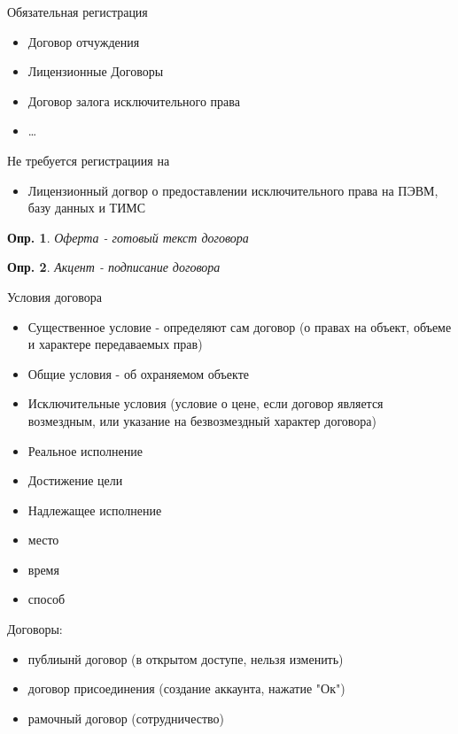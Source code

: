 \documentclass[12pt]{article}
\newtheorem{definition}{Опр.}
\begin{document}
Обязательная регистрация
\begin{itemize}
  \item Договор отчуждения
  \item Лицензионные Договоры
  \item Договор залога исключительного права
  \item \dots
\end{itemize}
Не требуется регистрациия на 
\begin{itemize}
  \item Лицензионный догвор о предоставлении исключительного права на ПЭВМ, базу данных и ТИМС
\end{itemize}

\begin{definition}
  Оферта - готовый текст договора
\end{definition}

\begin{definition}
  Акцент - подписание договора
\end{definition}

Условия договора
\begin{itemize}
  \item Существенное условие - определяют сам договор (о правах на объект, объеме и характере передаваемых прав)
  \item Общие условия - об охраняемом объекте
  \item Исключительные условия (условие о цене, если договор является возмездным, или указание на безвозмездный характер договора)
\end{itemize}

\begin{itemize}
  \item Реальное исполнение
  \item Достижение цели
  \item Надлежащее исполнение
  \item место
  \item время
  \item способ
\end{itemize}

Договоры:
\begin{itemize}
  \item публиынй договор (в открытом доступе, нельзя изменить)
  \item договор присоединения (создание аккаунта, нажатие "Ок")
  \item рамочный договор (сотрудничество)
\end{itemize}
\end{document}
